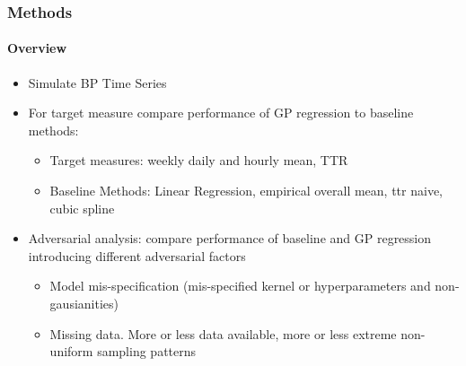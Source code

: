 \documentclass[
	8pt, %
]{beamer}
\begin{document}
\begin{frame}
	\frametitle{Methods}
	\framesubtitle{Overview}

	\begin{itemize}
		\item Simulate BP Time Series
	\end{itemize}

	\bigskip %

	\begin{itemize}
		\item For target measure compare performance of GP regression to baseline methods:
		\begin{itemize}
			\item Target measures: weekly daily and hourly mean, TTR
			\item Baseline Methods: Linear Regression, empirical overall mean, ttr naive, cubic spline
		\end{itemize}
	\end{itemize}

	\bigskip %

	\begin{itemize}
		\item Adversarial analysis: compare performance of baseline and GP regression introducing different adversarial
		factors
		\begin{itemize}
			\item Model mis-specification (mis-specified kernel or hyperparameters and non-gausianities)
			\item Missing data. More or less data available, more or less extreme non-uniform sampling patterns
		\end{itemize}

	\end{itemize}

\end{frame}
\end{document}
